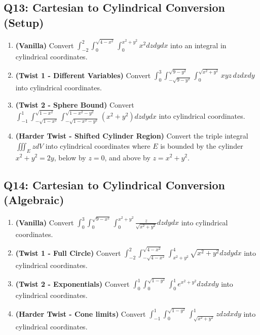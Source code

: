 \documentclass[11pt]{article}
\begin{document}
\subsection{Q13: Cartesian to Cylindrical Conversion (Setup)}
\begin{enumerate}[label=\textbf{13\alph*.}]
    \item \textbf{(Vanilla)} Convert $\int_{-2}^2 \int_0^{\sqrt{4-x^2}} \int_{0}^{x^2+y^2} x^2 dz dy dx$ into an integral in cylindrical coordinates.
    \item \textbf{(Twist 1 - Different Variables)} Convert $\int_{0}^3 \int_{-\sqrt{9-y^2}}^{\sqrt{9-y^2}} \int_{0}^{\sqrt{x^2+y^2}} xyz \, dz dx dy$ into cylindrical coordinates.
    \item \textbf{(Twist 2 - Sphere Bound)} Convert $\int_{-1}^1 \int_{-\sqrt{1-x^2}}^{\sqrt{1-x^2}} \int_{-\sqrt{1-x^2-y^2}}^{\sqrt{1-x^2-y^2}} (x^2+y^2) dz dy dx$ into cylindrical coordinates.
    \item \textbf{(Harder Twist - Shifted Cylinder Region)} Convert the triple integral $\iiint_E z dV$ into cylindrical coordinates where $E$ is bounded by the cylinder $x^2+y^2=2y$, below by $z=0$, and above by $z=x^2+y^2$.
\end{enumerate}

\subsection{Q14: Cartesian to Cylindrical Conversion (Algebraic)}
\begin{enumerate}[label=\textbf{14\alph*.}]
    \item \textbf{(Vanilla)} Convert $\int_0^3 \int_0^{\sqrt{9-x^2}} \int_{0}^{x^2+y^2} \frac{z}{\sqrt{x^2+y^2}} dz dy dx$ into cylindrical coordinates.
    \item \textbf{(Twist 1 - Full Circle)} Convert $\int_{-2}^2 \int_{-\sqrt{4-x^2}}^{\sqrt{4-x^2}} \int_{x^2+y^2}^{4} \sqrt{x^2+y^2} dz dy dx$ into cylindrical coordinates.
    \item \textbf{(Twist 2 - Exponentials)} Convert $\int_0^1 \int_0^{\sqrt{1-y^2}} \int_0^{1} e^{x^2+y^2} dz dx dy$ into cylindrical coordinates.
    \item \textbf{(Harder Twist - Cone limits)} Convert $\int_{-1}^1 \int_{0}^{\sqrt{1-y^2}} \int_{\sqrt{x^2+y^2}}^{1} z dz dx dy$ into cylindrical coordinates.
\end{enumerate}
\end{document}
